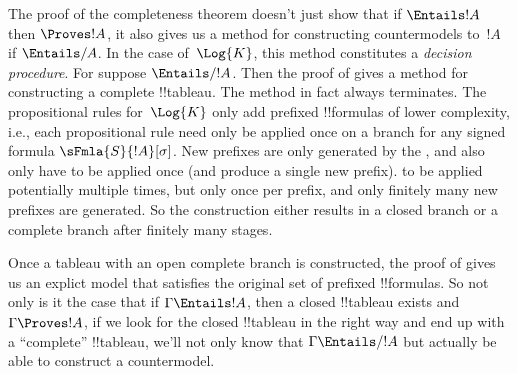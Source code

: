 \documentclass[../../../include/open-logic-section]{subfiles}
\begin{document}
      

\begin{explain}
  The proof of the completeness theorem doesn't just show that if
  $\Entails !A$ then $\Proves !A$, it also gives us a method for
  constructing countermodels to~$!A$ if $\Entails/ A$. In the case
  of~$\Log{K}$, this method constitutes a \emph{decision
    procedure}. For suppose $\Entails/ !A$. Then the proof of
   gives a method for constructing a
  complete !!{tableau}. The method in fact always terminates. The
  propositional rules for~$\Log{K}$ only add prefixed !!{formula}s of
  lower complexity, i.e., each propositional rule need only be applied
  once on a branch for any signed formula $\sFmla{S}{!A}[\sigma]$. New
  prefixes are only generated by the
  , and also only have to
  be applied once (and produce a single new prefix).
   to be applied potentially
  multiple times, but only once per prefix, and only finitely many new
  prefixes are generated. So the construction either results in a
  closed branch or a complete branch after finitely many stages.

  Once a tableau with an open complete branch is constructed, the
  proof of  gives us an explict model
  that satisfies the original set of prefixed !!{formula}s. So not
  only is it the case that if $\Gamma \Entails !A$, then a closed
  !!{tableau} exists and $\Gamma \Proves !A$, if we look for the
  closed !!{tableau} in the right way and end up with a ``complete''
  !!{tableau}, we'll not only know that $\Gamma \Entails/ !A$ but
  actually be able to construct a countermodel.
\end{explain}
\end{document}
